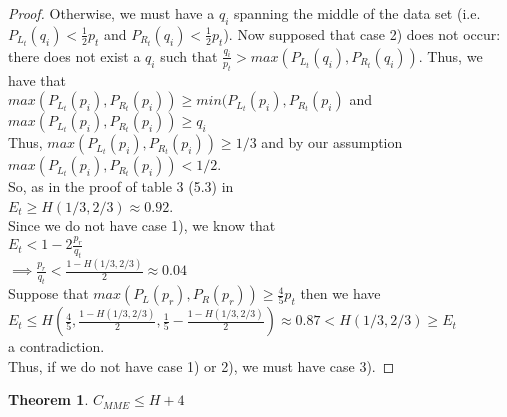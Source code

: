 \documentclass[letterpaper,12pt,titlepage,oneside,final]{book}
\theoremstyle{plain}
\newtheorem{thm}{Theorem}[section]
\begin{document}
\begin{proof}
 Otherwise, we must have a $q_i$ spanning the middle of the data set (i.e. $P_{L_t}(q_i) < \frac{1}{2}p_t$ and $P_{R_t}(q_i) < \frac{1}{2}p_t$). Now supposed that case 2) does not occur: there does not exist a $q_i$ such that $\frac{q_i}{p_t} > max(P_{L_t}(q_i), P_{R_t}(q_i))$. Thus, we have that \\ $max(P_{L_t}(p_i), P_{R_t}(p_i)) \geq min(P_{L_t}(p_i), P_{R_t}(p_i)$ and \\ $max(P_{L_t}(p_i), P_{R_t}(p_i)) \geq q_i$ \\ Thus, $max(P_{L_t}(p_i), P_{R_t}(p_i)) \geq 1/3$ and by our assumption $max(P_{L_t}(p_i), P_{R_t}(p_i)) < 1/2$. \\
 So, as in the proof of table 3 (5.3) in \cite{guttler1980binary}\\
 $E_t \geq H(1/3, 2/3) \approx 0.92$. \\
 Since we do not have case 1), we know that \\
 $E_t < 1-2\frac{p_r}{q_t}$ \\
$ \implies \frac{p_r}{q_t} < \frac{1-H(1/3, 2/3)}{2} \approx 0.04$ \\
Suppose that $max(P_L(p_r), P_R(p_r)) \geq \frac{4}{5} p_t$ then we have \\
$E_t \leq H(\frac{4}{5}, \frac{1-H(1/3, 2/3)}{2}, \frac{1}{5}-\frac{1-H(1/3, 2/3)}{2}) \approx 0.87 < H(1/3, 2/3) \geq E_t$ \\ 
a contradiction. \\
Thus, if we do not have case 1) or 2), we must have case 3).
 

\end{proof}



\begin{thm}
$C_{MME} \leq H + 4$
\end{thm}
\end{document}
